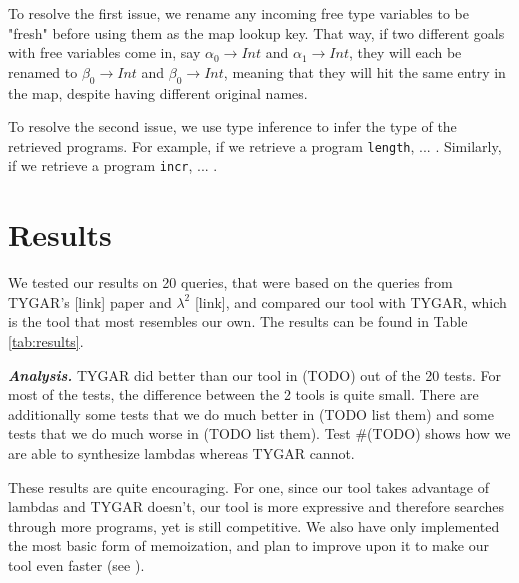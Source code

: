 \documentclass[acmsmall,nonacm]{acmart}
\begin{document}
To resolve the first issue, we rename any incoming free type variables 
to be "fresh" before using them as the map lookup key. That way, if 
two different goals with free variables come in, say $\alpha_0 \to Int$ and 
$\alpha_1 \to Int$, they will each be renamed to $\beta_0 \to Int$ 
and $\beta_0 \to Int$, meaning that they will hit the same entry in the map,
despite having different original names.

To resolve the second issue, we use type inference to infer the type of 
the retrieved programs. For example, if we retrieve a program \verb|length|, 
... . %
Similarly, if we retrieve a program \verb|incr|, 
... . %








\section{Results}



We tested our results on 20 queries, that were based on the queries 
from TYGAR's [link] paper and ${\lambda^2}$ [link], and compared our tool with TYGAR, 
which is the tool that most resembles our own. The results can be found in 
Table \ref{tab:results}.


\vspace{2mm}
\noindent \textbf{\textit{Analysis.}} 
TYGAR did better than our tool in (TODO) out of the 20 tests. 
For most of the tests, the difference between the 2 tools is quite small. There
are additionally some tests that we do much better in (TODO list them)
and some tests that we do much worse in (TODO list them).
Test \#(TODO) shows how we are able to synthesize lambdas whereas TYGAR cannot.

These results are quite encouraging. For one, since our tool takes advantage of 
lambdas and TYGAR doesn't, our tool is more expressive and therefore searches through 
more programs, yet is still competitive. We also have only implemented the most
basic form of memoization, and plan to improve upon it to make our tool even
faster (see ).
\end{document}
